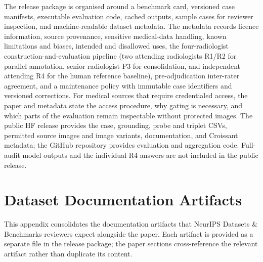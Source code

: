 \documentclass{article}
\providecommand{\DIFaddtex}[1]{{\protect\color{blue} \sf #1}} %
\providecommand{\DIFdeltex}[1]{{\protect\color{red} \scriptsize #1}} %
\providecommand{\DIFaddbegin}{} %
\providecommand{\DIFaddend}{} %
\providecommand{\DIFdelbegin}{} %
\providecommand{\DIFdelend}{} %
\providecommand{\DIFadd}[1]{\texorpdfstring{\DIFaddtex{#1}}{#1}} %
\providecommand{\DIFdel}[1]{\texorpdfstring{\DIFdeltex{#1}}{}} %
\begin{document}
The release package is organised around a benchmark card, versioned case manifests, executable evaluation code, \DIFdelbegin \DIFdel{cached outputs, }\DIFdelend sample cases for reviewer inspection, and machine-readable dataset metadata. The metadata records licence information, source provenance, sensitive medical-data handling, known limitations and biases, intended and disallowed uses, the four-radiologist construction-and-evaluation pipeline (two attending radiologists \textsc{R1}/\textsc{R2} for parallel annotation, senior radiologist \textsc{P3} for consolidation, and independent attending \textsc{R4} for the human reference baseline), pre-adjudication inter-rater agreement, and a maintenance policy with immutable case identifiers and versioned corrections. \DIFdelbegin \DIFdel{For medical sources that require credentialed access, the paper and metadata state the access procedure, why gating is necessary, and which parts of the evaluation remain inspectable without protected images. }\DIFdelend \DIFaddbegin \DIFadd{The public HF release provides the case, grounding, probe and triplet CSVs, permitted source images and image variants, documentation, and Croissant metadata; the GitHub repository provides evaluation and aggregation code. Full-audit model outputs and the individual \textsc{R4} answers are not included in the public release.
}\DIFaddend 

\section{Dataset Documentation Artifacts}
\label{app:documentation}

This appendix consolidates the documentation artifacts that NeurIPS Datasets \& Benchmarks reviewers expect alongside the paper. Each artifact is provided as a separate file in the release package; the paper sections cross-reference the relevant artifact rather than duplicate its content.
\end{document}
